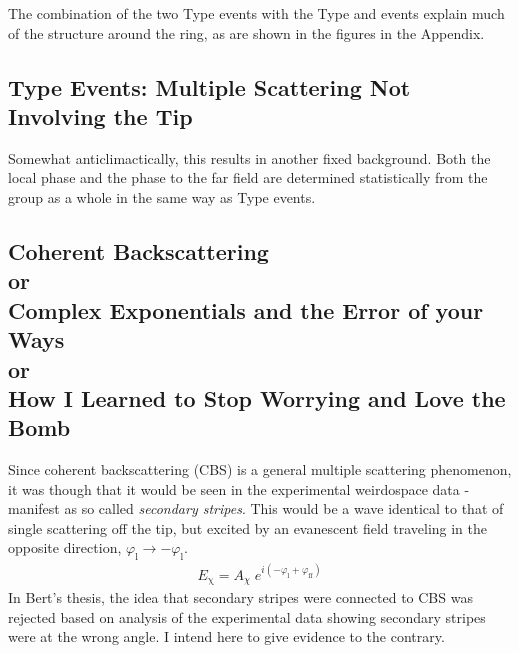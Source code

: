 The combination of the two Type  events with the Type 
and  events explain much of the structure around the ring, as are
shown in the figures in the Appendix.

\subsection{Type  Events: Multiple Scattering Not Involving the Tip}
Somewhat anticlimactically, this results in another fixed background.  Both
the local phase and the phase to the far field are determined statistically
from the group as a whole in the same way as Type  events.

\subsection{Coherent Backscattering\\{\normalsize or}\\
Complex Exponentials and the Error of your Ways
\\{\normalsize or}\\
How I Learned to Stop Worrying and Love the Bomb
}
Since coherent backscattering (CBS) is a general multiple scattering
phenomenon, it was though that it would be seen in the experimental
weirdospace data - manifest as so called {\it secondary stripes}.  This
would be a wave identical to that of single scattering off the tip, but
excited by an evanescent field traveling in the opposite direction,
$\varphi_{\mathrm{l}}\to-\varphi_{\mathrm{l}}$.
\begin{align}
E_\mathrm{\chi}=A_\chi\;e^{i (-\varphi_{\mathrm{l}}+\varphi_{\mathrm{ff}})}
\label{eqn:cbs}
\end{align}
In Bert's thesis, the idea that secondary stripes were connected to CBS was
rejected based on analysis of the experimental data showing secondary
stripes were at the wrong angle.  I intend here to give evidence to the
contrary.

